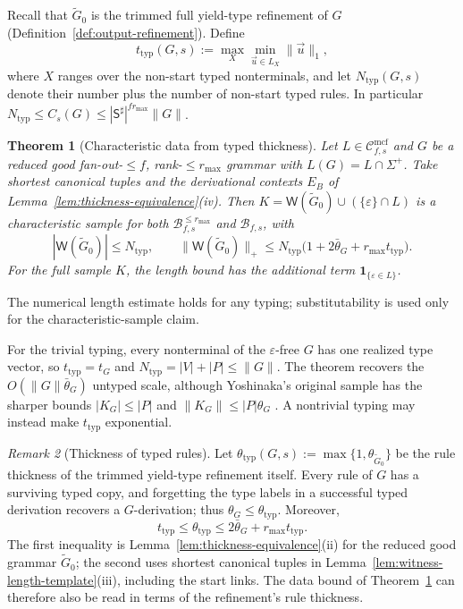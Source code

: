 \documentclass[11pt]{article}
\numberwithin{equation}{section}
\theoremstyle{plain}
\newtheorem{theorem}{Theorem}[section]
\theoremstyle{definition}
\theoremstyle{remark}
\newtheorem{remark}[theorem]{Remark}
\newcommand{\Wit}{\mathsf{W}}
\newcommand{\Cmcf}[2]{\mathcal{C}^{\mathrm{mcf}}_{#1,#2}}
\newcommand{\tuple}[1]{\vec{#1}}
\newcommand{\eps}{\varepsilon}
\theoremstyle{plain}
\begin{document}
Recall that $\widetilde G_0$ is the trimmed full yield-type refinement of $G$
(Definition~\ref{def:output-refinement}).  Define
\[
 t_{\mathrm{typ}}(G,s):=\max_{X}\min_{\tuple u\in L_X}\|\tuple u\|_1,
\]
where $X$ ranges over the non-start typed nonterminals, and let
$N_{\mathrm{typ}}(G,s)$ denote their number plus the number of non-start
typed rules.  In particular $N_{\mathrm{typ}}\le C_s(G)\le
|\mathsf S^\sharp|^{fr_{\max}}\|G\|$.

\begin{theorem}[Characteristic data from typed thickness]
\label{thm:data-from-typed-thickness}
Let $L\in\Cmcf{f}{s}$ and $G$ be a reduced good fan-out-$\le f$,
rank-$\le r_{\max}$ grammar with $L(G)=L\cap\Sigma^+$.
Take shortest canonical tuples and the derivational contexts $E_B$ of
Lemma~\ref{lem:thickness-equivalence}(iv).  Then
$K=\Wit(\widetilde G_0)\cup(\{\eps\}\cap L)$ is a characteristic sample
for both $\mathcal B^{\le r_{\max}}_{f,s}$ and $\mathcal B_{f,s}$, with
\[
 |\Wit(\widetilde G_0)|\le N_{\mathrm{typ}},\qquad
 \|\Wit(\widetilde G_0)\|_+\le
 N_{\mathrm{typ}}\bigl(1+2\bar\theta_G+r_{\max}t_{\mathrm{typ}}\bigr).
\]
For the full sample $K$, the length bound has the additional term
$\mathbf 1_{\{\eps\in L\}}$.
\end{theorem}

The numerical length estimate holds for any typing; substitutability is used
only for the characteristic-sample claim.

For the trivial typing, every nonterminal of the $\eps$-free $G$ has one
realized type vector, so $t_{\mathrm{typ}}=t_G$ and
$N_{\mathrm{typ}}=|V|+|P|\le\|G\|$.  The theorem recovers the
$O(\|G\|\bar\theta_G)$ untyped scale, although Yoshinaka's original
sample has the sharper bounds $|K_G|\le|P|$ and
$\|K_G\|\le|P|\theta_G$ \cite[Lemma~7 and Theorem~1]{Yoshinaka2011}.
A nontrivial typing may instead make $t_{\mathrm{typ}}$ exponential.

\begin{remark}[Thickness of typed rules]
\label{rem:typed-thickness-equivalence}
\label{lem:typed-thickness-equivalence}
Let $\theta_{\mathrm{typ}}(G,s):=
\max\{1,\theta_{\widetilde G_0}\}$ be the rule thickness of the
trimmed yield-type refinement itself.  Every rule of $G$ has a
surviving typed copy, and forgetting the type labels in a
successful typed derivation recovers a $G$-derivation; thus
$\theta_G\le\theta_{\mathrm{typ}}$.
Moreover,
\[
 t_{\mathrm{typ}}\le\theta_{\mathrm{typ}}
 \le2\bar\theta_G+r_{\max}t_{\mathrm{typ}}.
\]
The first inequality is Lemma~\ref{lem:thickness-equivalence}(ii)
for the reduced good grammar $\widetilde G_0$; the second uses
shortest canonical tuples in
Lemma~\ref{lem:witness-length-template}(iii), including the start
links.  The data bound of
Theorem~\ref{thm:data-from-typed-thickness} can therefore also be
read in terms of the refinement's rule thickness.
\end{remark}
\end{document}
